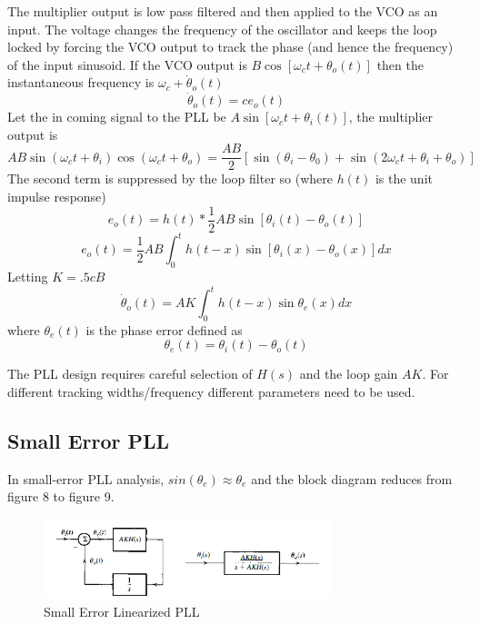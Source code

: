 \documentclass{article}
\begin{document}
    The multiplier output is low pass filtered and then applied to the VCO as an input. The voltage changes the frequency of the oscillator and keeps the loop
    locked by forcing the VCO output to track the phase (and hence the frequency) of the input sinusoid. If the VCO output is $B\cos[\omega_ct + \theta_o(t)]$ 
    then the instantaneous frequency is $\omega_c + \dot{\theta}_o(t)$
    \begin{equation}
        \dot{\theta}_o(t) = ce_o(t)
    \end{equation}
    Let the in coming signal to the PLL be $A\sin[\omega_ct + \theta_i(t)]$, the multiplier output is
    \begin{equation}
        AB\sin(\omega_ct + \theta_i)\cos(\omega_ct + \theta_o) = \frac{AB}{2}[\sin(\theta_i - \theta_0) + \sin(2\omega_ct + \theta_i + \theta_o)]
    \end{equation}
    The second term is suppressed by the loop filter so (where $h(t)$ is the unit impulse response)
    \begin{equation}
        e_o(t) = h(t) \ast \frac{1}{2}AB\sin[\theta_i(t) - \theta_o(t)]
    \end{equation}
    \begin{equation}
        e_o(t) = \frac{1}{2}AB \int_{0}^{t}h(t-x)\sin[\theta_i(x) - \theta_o(x)]dx
    \end{equation}
    Letting $K = .5cB$
    \begin{equation}
        \dot{\theta}_o(t) = AK\int_{0}^{t}h(t-x)\sin\theta_e(x)dx
    \end{equation}
    where $\theta_e(t)$ is the phase error defined as 
    \begin{equation}
        \theta_e(t) = \theta_i(t) - \theta_o(t)
    \end{equation}

    The PLL design requires careful selection of $H(s)$ and the loop gain $AK$. For different tracking widths/frequency different parameters need to be used. 

    \subsection{Small Error PLL}
    In small-error PLL analysis, $sin(\theta_e) \approx \theta_e$ and the block diagram reduces from figure 8 to figure 9. 
    \begin{figure}[h]
        \centering
        \includegraphics[width=0.75\textwidth]{smallerr}
        \caption{Small Error Linearized PLL}
    \end{figure}
\end{document}
